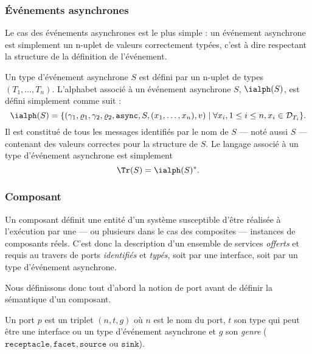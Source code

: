 \subsubsection{\'Ev\'enements asynchrones}

Le cas des \'ev\'enements asynchrones est le plus simple : un
\'ev\'enement asynchrone est simplement un n-uplet de valeurs
correctement typ\'ees, c'est \`a dire respectant la structure de la
d\'efinition de l'\'ev\'enement.

\begin{definition}
\label{def:typeasync}
    Un type d'\'ev\'enement asynchrone $S$ est d\'efini par un
    n-uplet de types  $(T_1,\dots,T_n)$.
L'alphabet associ\'e \`a un \'ev\'enement asynchrone $S$,
    $\ialph(S)$, est d\'efini simplement comme suit :
$$
\ialph(S) = \{(\gamma_1,\varrho_1,\gamma_2,\varrho_2,\mathtt{async},S,(x_1,\dots,x_n),v) \mid
\forall x_i, 1\leq i\leq n, x_i \in {\cal D}_{T_i}\}.
$$
Il est constitu\'e de tous les messages identifi\'es par le nom de
$S$ --- not\'e aussi $S$ --- contenant des valeurs correctes pour la
structure de $S$. Le langage associ\'e \`a un type d'\'ev\'enement
asynchrone est simplement 
$$
\Tr(S) = \ialph(S)^*.
$$
\end{definition}
 
\subsubsection{Composant}

Un composant d\'efinit une entit\'e d'un syst\`eme susceptible
d'\^etre r\'ealis\'ee \`a l'ex\'ecution par une --- ou plusieurs
dans le cas des composites --- instances de composants r\'eels. C'est donc la description d'un
ensemble de services \emph{offerts}  et requis au travers de ports
\emph{identifi\'es} et \emph{typ\'es}, soit par une interface, soit
par un type d'\'ev\'enement asynchrone. 

Nous d\'efinissons donc tout d'abord la notion de port  avant de
d\'efinir la s\'emantique d'un composant.

\begin{definition}[Port]
\label{def:port}
    Un port $p$ est un triplet $(n, t, g)$ o\`u $n$ est le nom du port,
    $t$ son type  qui peut \^etre une interface ou un type
    d'\'ev\'enement asynchrone et $g$ son \emph{genre}
    ($\mathtt{receptacle}, 
    \mathtt{facet}, \mathtt{source}$  ou $\mathtt{sink}$).
\end{definition}

